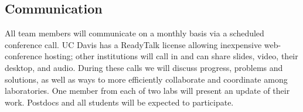 \renewcommand{\thepage}{Management Plan - Page \arabic{page} of 3}

%
%

\subsection*{Communication} 

All team members will communicate on a monthly basis via a scheduled conference call. UC Davis has a ReadyTalk license allowing inexpensive web-conference hosting; other institutions will call in and can share slides, video, their desktop, and audio.  During these calls we will discuss progress, problems and solutions, as well as ways to more efficiently collaborate and coordinate among laboratories.  One member from each of two labs will present an update of their work.  Postdocs and all students will be expected to participate.

